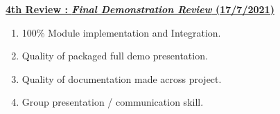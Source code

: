 \textbf {\underline{4th Review :  \textit{Final Demonstration Review} (17/7/2021)}}
\begin{enumerate}
\item 100\% Module implementation and Integration.
\item Quality of packaged full demo presentation.
\item Quality of documentation made across project.
\item Group presentation / communication skill. 
\end{enumerate}



